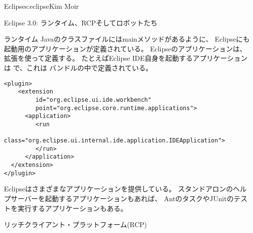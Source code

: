 \begin{aosachapter}{Eclipse}{s:eclipse}{Kim Moir}
\begin{aosasect1}{Eclipse 3.0: ランタイム、RCPそしてロボットたち}
\begin{aosasect2}{ランタイム}
Javaのクラスファイルにはmainメソッドがあるように、
Eclipseにも起動用のアプリケーションが定義されている。
Eclipseのアプリケーションは、拡張を使って定義する。
たとえばEclipse IDE自身を起動するアプリケーションは
で、これは
バンドルの中で定義されている。

\begin{verbatim}
<plugin>
    <extension
         id="org.eclipse.ui.ide.workbench"
         point="org.eclipse.core.runtime.applications">
      <application>
         <run
               class="org.eclipse.ui.internal.ide.application.IDEApplication">
         </run>
      </application>
  </extension>
</plugin>
\end{verbatim}

Eclipseはさまざまなアプリケーションを提供している。
スタンドアロンのヘルプサーバーを起動するアプリケーションもあれば、
AntのタスクやJUnitのテストを実行するアプリケーションもある。

\end{aosasect2}

\begin{aosasect2}{リッチクライアント・プラットフォーム(RCP)}


\end{aosasect2}
\end{aosasect1}
\end{aosachapter}

